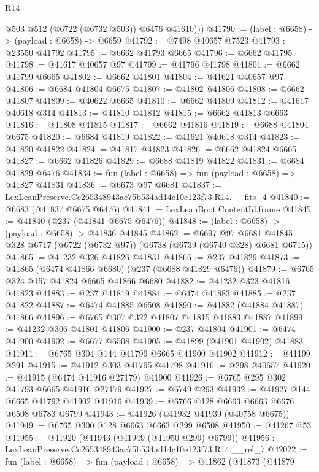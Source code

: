 \begin{lexlean}{R14}
\begin{coremodule}
          @503
          @512
          (@6722 (@6732 @503))
          @6476
          @41610)))
@41790 := (label : @6658) -> (payload : @6658) -> @6659
@41792 := @7498 @40657 @7523
@41793 := @23550 @41792
@41795 := @6662 @41793 @6665
@41796 := @6662 @41795
@41798 := @41617 @40657 @97
@41799 := @41796 @41798
@41801 := @6662 @41799 @6665
@41802 := @6662 @41801
@41804 := @41621 @40657 @97
@41806 := @6684 @41804 @6675
@41807 := @41802 @41806
@41808 := @6662 @41807
@41809 := @40622 @6665
@41810 := @6662 @41809
@41812 := @41617 @40618 @314
@41813 := @41810 @41812
@41815 := @6662 @41813 @6663
@41816 := @41808 @41815
@41817 := @6662 @41816
@41819 := @6688 @41804 @6675
@41820 := @6684 @41819
@41822 := @41621 @40618 @314
@41823 := @41820 @41822
@41824 := @41817 @41823
@41826 := @6662 @41824 @6665
@41827 := @6662 @41826
@41829 := @6688 @41819 @41822
@41831 := @6684 @41829 @6476
@41834 := fun (label : @6658) => fun (payload : @6658) => @41827 @41831
@41836 := @6673 @97 @6681
@41837 := LexLeanPreserve.Cc265348943ac75b534ad14c10e123f73.R14.__fits_4
@41840 := @6683 (@41837 @6675 @6476)
@41841 := LexLeanBoot.ContentId.frame
@41845 := @41840 (@237 (@41841 @6675 @6476))
@41848 := (label : @6658) -> (payload : @6658) -> @41836 @41845
@41862 := @6697
    @97
    @6681
    @41845
    @328
    @6717
    (@6722 (@6732 @97))
    (@6738 (@6739 (@6740 @328) @6681 @6715))
@41865 := @41232 @326 @41826 @41831
@41866 := @237 @41829
@41873 := @41865 (@6474 @41866 @6680) (@237 (@6688 @41829 @6476))
@41879 := @6765 @324 @157 @41824 @6665 @41866 @6680
@41882 := @41232 @323 @41816 @41823
@41883 := @237 @41819
@41884 := @6474 @41883
@41885 := @237 @41822
@41887 := @6474 @41885 @6508
@41890 := @41882 (@41884 @41887) @41866
@41896 := @6765 @307 @322 @41807 @41815 @41883 @41887
@41899 := @41232 @306 @41801 @41806
@41900 := @237 @41804
@41901 := @6474 @41900
@41902 := @6677 @6508
@41905 := @41899 (@41901 @41902) @41883
@41911 := @6765 @304 @144 @41799 @6665 @41900 @41902
@41912 := @41199 @291
@41915 := @41912 @303 @41795 @41798
@41916 := @298 @40657
@41920 := @41915 (@6474 @41916 @27179) @41900
@41926 := @6765 @295 @302 @41793 @6665 @41916 @27179
@41927 := @6749 @293
@41932 := @41927 @144 @6665 @41792 @41902 @41916
@41939 := @6766 @128 @6663 @6663 @6676 @6508 @6783 @6799
@41943 := @41926 (@41932 @41939 (@40758 @6675))
@41949 := @6765 @300 @128 @6663 @6663 @299 @6508
@41950 := @41267 @53
@41955 := @41920 (@41943 (@41949 (@41950 @299) @6799))
@41956 := LexLeanPreserve.Cc265348943ac75b534ad14c10e123f73.R14.__rel_7
@42022 := fun (label : @6658) =>
  fun (payload : @6658) =>
  @41862
    (@41873
      (@41879

\end{coremodule}
\end{lexlean}
